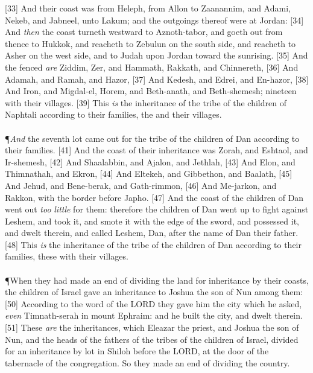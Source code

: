 [33] \textcolor[cmyk]{0.99998,1,0,0}{And their coast was from Heleph, from Allon to Zaanannim, and Adami, Nekeb, and Jabneel, unto Lakum; and the outgoings thereof were at Jordan:}
[34] \textcolor[cmyk]{0.99998,1,0,0}{And \emph{then} the coast turneth westward to Aznoth-tabor, and goeth out from thence to Hukkok, and reacheth to Zebulun on the south side, and reacheth to Asher on the west side, and to Judah upon Jordan toward the sunrising.}
[35] \textcolor[cmyk]{0.99998,1,0,0}{And the fenced  \emph{are} Ziddim, Zer, and Hammath, Rakkath, and Chinnereth,}
[36] \textcolor[cmyk]{0.99998,1,0,0}{And Adamah, and Ramah, and Hazor,}
[37] \textcolor[cmyk]{0.99998,1,0,0}{And Kedesh, and Edrei, and En-hazor,}
[38] \textcolor[cmyk]{0.99998,1,0,0}{And Iron, and Migdal-el, Horem, and Beth-anath, and Beth-shemesh; nineteen  with their villages.}
[39] \textcolor[cmyk]{0.99998,1,0,0}{This \emph{is} the inheritance of the tribe of the children of Naphtali according to their families, the  and their villages.}\\
\\
\P \textcolor[cmyk]{0.99998,1,0,0}{\emph{And} the seventh lot came out for the tribe of the children of Dan according to their families.}
[41] \textcolor[cmyk]{0.99998,1,0,0}{And the coast of their inheritance was Zorah, and Eshtaol, and Ir-shemesh,}
[42] \textcolor[cmyk]{0.99998,1,0,0}{And Shaalabbin, and Ajalon, and Jethlah,}
[43] \textcolor[cmyk]{0.99998,1,0,0}{And Elon, and Thimnathah, and Ekron,}
[44] \textcolor[cmyk]{0.99998,1,0,0}{And Eltekeh, and Gibbethon, and Baalath,}
[45] \textcolor[cmyk]{0.99998,1,0,0}{And Jehud, and Bene-berak, and Gath-rimmon,}
[46] \textcolor[cmyk]{0.99998,1,0,0}{And Me-jarkon, and Rakkon, with the border before Japho.}
[47] \textcolor[cmyk]{0.99998,1,0,0}{And the coast of the children of Dan went out \emph{too} \emph{little} for them: therefore the children of Dan went up to fight against Leshem, and took it, and smote it with the edge of the sword, and possessed it, and dwelt therein, and called Leshem, Dan, after the name of Dan their father.}
[48] \textcolor[cmyk]{0.99998,1,0,0}{This \emph{is} the inheritance of the tribe of the children of Dan according to their families, these  with their villages.}\\
\\
\P \textcolor[cmyk]{0.99998,1,0,0}{When they had made an end of dividing the land for inheritance by their coasts, the children of Israel gave an inheritance to Joshua the son of Nun among them:}
[50] \textcolor[cmyk]{0.99998,1,0,0}{According to the word of the LORD they gave him the city which he asked, \emph{even} Timnath-serah in mount Ephraim: and he built the city, and dwelt therein.}
[51] \textcolor[cmyk]{0.99998,1,0,0}{These \emph{are} the inheritances, which Eleazar the priest, and Joshua the son of Nun, and the heads of the fathers of the tribes of the children of Israel, divided for an inheritance by lot in Shiloh before the LORD, at the door of the tabernacle of the congregation. So they made an end of dividing the country.}